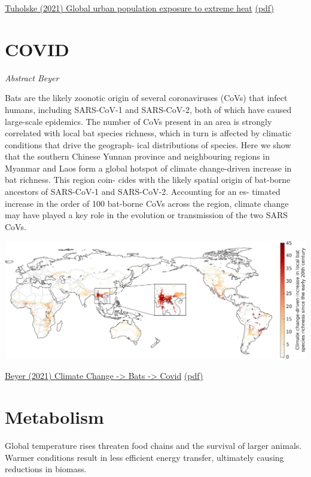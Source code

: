 \documentclass[
]{book}
\begin{document}
\href{https://doi.org/10.1073/pnas.2024792118}{Tuholske (2021) Global urban population exposure to extreme heat}
\href{pdf/Tuholske_2021_Urban_Extreme_Heat.pdf}{(pdf)}

\hypertarget{covid}{%
\section{COVID}\label{covid}}

\emph{Abstract Beyer}

Bats are the likely zoonotic origin of several coronaviruses (CoVs) that infect humans, including SARS-CoV-1 and
SARS-CoV-2, both of which have caused large-scale epidemics. The number of CoVs present in an area is strongly
correlated with local bat species richness, which in turn is affected by climatic conditions that drive the geograph-
ical distributions of species. Here we show that the southern Chinese Yunnan province and neighbouring regions
in Myanmar and Laos form a global hotspot of climate change-driven increase in bat richness. This region coin-
cides with the likely spatial origin of bat-borne ancestors of SARS-CoV-1 and SARS-CoV-2. Accounting for an es-
timated increase in the order of 100 bat-borne CoVs across the region, climate change may have played a key role
in the evolution or transmission of the two SARS CoVs.

\includegraphics{fig/climate_change_bats_covid.jpg}

\href{https://www.sciencedirect.com/science/article/pii/S0048969721004812}{Beyer (2021) Climate Change -\textgreater{} Bats -\textgreater{} Covid}
\href{pdf/Beyer_2010_Climate_Change_Bat_Covid.pdf}{(pdf)}

\hypertarget{metabolism}{%
\section{Metabolism}\label{metabolism}}

Global temperature rises threaten food chains and the survival of larger animals.
Warmer conditions result in less efficient energy transfer, ultimately causing reductions in biomass.
\end{document}
